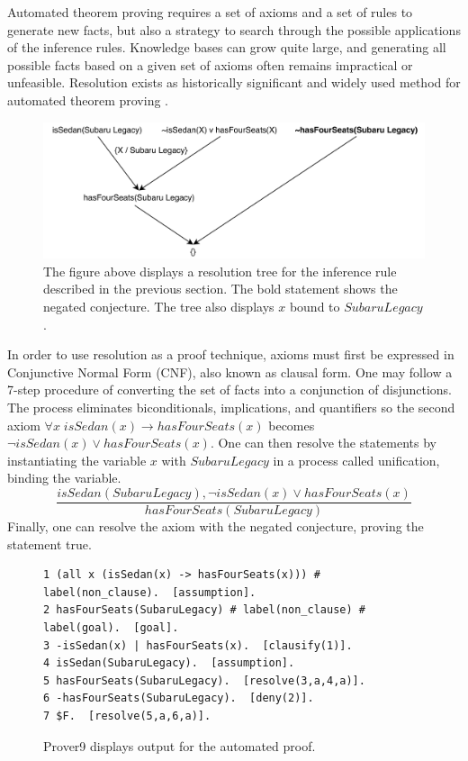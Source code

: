 \documentclass{article}
\begin{document}
Automated theorem proving requires a set of axioms and a set of rules to generate new facts, but also a strategy to search through the possible applications of the inference rules. Knowledge bases can grow quite large, and generating all possible facts based on a given set of axioms often remains impractical or unfeasible. Resolution exists as historically significant and widely used method for automated theorem proving \cite[51]{ertel2018introduction}. 

\begin{figure}[h]
\centering
\includegraphics[width=6in]{resolution_tree}
\caption{The figure above displays a resolution tree for the inference rule described in the previous section. The bold statement shows the negated conjecture. The tree also displays $x$ bound to $SubaruLegacy$.}
\label{fig:resolution_tree}
\end{figure}

In order to use resolution as a proof technique, axioms must first be expressed in Conjunctive Normal Form (CNF), also known as clausal form. One may follow a 7-step procedure of converting the set of facts into a conjunction of disjunctions. The process eliminates biconditionals, implications, and quantifiers so the second axiom $\forall x \; isSedan(x) \rightarrow hasFourSeats(x)$ becomes 
$\lnot isSedan(x) \lor hasFourSeats(x)$. One can then resolve the statements by instantiating the variable $x$ with $SubaruLegacy$ in a process called unification, binding the variable. 
\[\frac{isSedan(Subaru Legacy), \lnot isSedan(x) \lor hasFourSeats(x)}{hasFourSeats(Subaru Legacy)}\]
Finally, one can resolve the axiom with the negated conjecture, proving the statement true. 

\begin{figure}[h]
\begin{verbatim}
1 (all x (isSedan(x) -> hasFourSeats(x))) # label(non_clause).  [assumption].
2 hasFourSeats(SubaruLegacy) # label(non_clause) # label(goal).  [goal].
3 -isSedan(x) | hasFourSeats(x).  [clausify(1)].
4 isSedan(SubaruLegacy).  [assumption].
5 hasFourSeats(SubaruLegacy).  [resolve(3,a,4,a)].
6 -hasFourSeats(SubaruLegacy).  [deny(2)].
7 $F.  [resolve(5,a,6,a)].
\end{verbatim}
\caption{Prover9 displays output for the automated proof. }
\label{fig:prover9out}
\end{figure}
\end{document}
